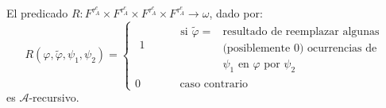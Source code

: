   \begin{lemma} \label{lemma_101}
    \PN El predicado $R: F^{\tau_{A}^{e}} \times F^{\tau_{A}^{e}} \times F^{\tau_{A}^{e}} \times F^{\tau_{A}^{e}}
    \rightarrow \omega$, dado por:
    \[
      R(\varphi, \tilde{\varphi}, \psi_{1}, \psi_{2}) = \left\{\begin{array}{cccl}
                                                                \begin{array}{c}
                                                                  1 \\
                                                                  \ \\
                                                                \end{array}
                                                                &&&
                                                                \begin{array}{cl}
                                                                  \text{si } \tilde{\varphi} = &\text{resultado de
                                                                    reemplazar algunas} \\
                                                                  &\text{(posiblemente } 0 \text{) ocurrencias de} \\
                                                                  &\psi_{1} \text{ en } \varphi \text{ por } \psi_{2}
                                                                \end{array} \\ 0 &&& \text{ caso contrario}
                                                              \end{array}\right.
    \]
    \PN es $\mathcal{A}$-recursivo.
  \end{lemma}

